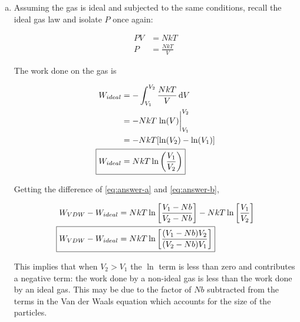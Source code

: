 \documentclass[12pt,a4paper,twocolumn]{article}
\begin{document}
\begin{enumerate}[(a)]
\item Assuming the gas is ideal and subjected to the same conditions, recall the ideal gas law and isolate $P$ once again:

\begin{align}
	PV &= NkT \label{eq:idealgas} \\
	P &= \frac{NkT}{V} \label{eq:idealpressure}
\end{align}

The work done on the gas is

\begin{align}
	W_{ideal} &= -\int_{V_1}^{V_2} \frac{NkT}{V} \dd{V} \nonumber \\
	&= -NkT \eval{\ln(V)}_{V_1}^{V_2} \nonumber \\
	&= -NkT \qty[\ln(V_2) - \ln(V_1)] \nonumber \\
	\Aboxed{
		W_{ideal} &= NkT\ln\qty(\frac{V_1}{V_2}) \label{eq:answer-b}
	}
\end{align}

Getting the difference of \eqref{eq:answer-a} and \eqref{eq:answer-b},

\begin{align}
	W_{VDW} - W_{ideal} &= NkT\ln\qty[\frac{V_1-Nb}{V_2-Nb}] - NkT\ln\qty[\frac{V_1}{V_2}] \nonumber \\
	\Aboxed{	
		W_{VDW} - W_{ideal} &= NkT\ln\qty[\frac{\qty(V_1-Nb)V_2}{\qty(V_2-Nb)V_1}]
	} 
\end{align}

This implies that when $V_2 > V_1$ the $\ln$ term is less than zero and contributes a negative term: the work done by a non-ideal gas is less than the work done by an ideal gas. This may be due to the factor of $Nb$ subtracted from the terms in the Van der Waals equation which accounts for the size of the particles.

\end{enumerate}
\end{document}
